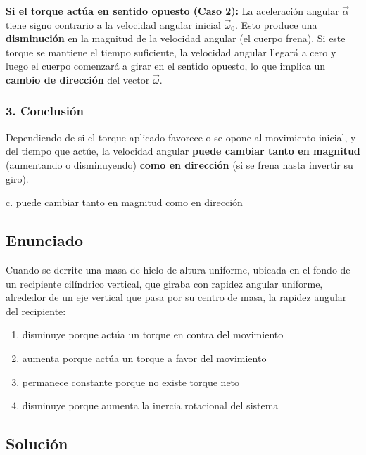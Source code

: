 \documentclass[12pt, a4paper]{article}
\begin{document}
\textbf{Si el torque actúa en sentido opuesto (Caso 2):}
La aceleración angular $\vec{\alpha}$ tiene signo contrario a la velocidad angular inicial $\vec{\omega}_0$. Esto produce una \textbf{disminución} en la magnitud de la velocidad angular (el cuerpo frena). Si este torque se mantiene el tiempo suficiente, la velocidad angular llegará a cero y luego el cuerpo comenzará a girar en el sentido opuesto, lo que implica un \textbf{cambio de dirección} del vector $\vec{\omega}$.

\subsubsection*{3. Conclusión}
Dependiendo de si el torque aplicado favorece o se opone al movimiento inicial, y del tiempo que actúe, la velocidad angular \textbf{puede cambiar tanto en magnitud} (aumentando o disminuyendo) \textbf{como en dirección} (si se frena hasta invertir su giro).

\begin{tcolorbox}[colback=green!5!white, colframe=green!50!black, title=Respuesta Correcta]
\centering \Large c. puede cambiar tanto en magnitud como en dirección
\end{tcolorbox}

\newpage

\subsection*{Enunciado}
Cuando se derrite una masa de hielo de altura uniforme, ubicada en el fondo de un recipiente cilíndrico vertical, que giraba con rapidez angular uniforme, alrededor de un eje vertical que pasa por su centro de masa, la rapidez angular del recipiente:
\begin{enumerate}[label=\alph*.]
    \item disminuye porque actúa un torque en contra del movimiento
    \item aumenta porque actúa un torque a favor del movimiento
    \item permanece constante porque no existe torque neto
    \item disminuye porque aumenta la inercia rotacional del sistema
\end{enumerate}

\subsection*{Solución}
\end{document}
